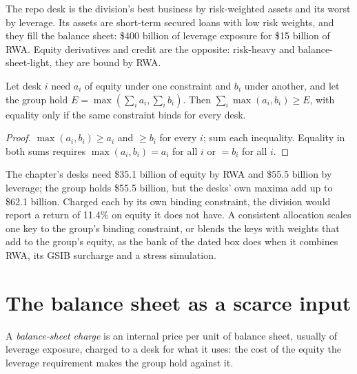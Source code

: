 The repo desk is the division's best business by risk-weighted assets and its worst by leverage. Its assets are short-term secured loans with low
risk weights, and they fill the balance sheet: \$400 billion of leverage exposure for \$15 billion of RWA. Equity derivatives and credit are the
opposite: risk-heavy and balance-sheet-light, they are bound by RWA.

\begin{proposition}\label{prop:fm:the-bank-markets-division:max}
Let desk $i$ need $a_i$ of equity under one constraint and $b_i$ under another, and let the group hold $E=\max(\sum_ia_i,\sum_ib_i)$. Then
$\sum_i\max(a_i,b_i)\ge E$, with equality only if the same constraint binds for every desk.
\end{proposition}

\begin{proof}
$\max(a_i,b_i)\ge a_i$ and $\ge b_i$ for every $i$; sum each inequality. Equality in both sums requires $\max(a_i,b_i)=a_i$ for all $i$ or
$=b_i$ for all $i$.
\end{proof}

The chapter's desks need \$35.1 billion of equity by RWA and \$55.5 billion by leverage; the group holds \$55.5 billion, but the desks' own
maxima add up to \$62.1 billion. Charged each by its own binding constraint, the division would report a return of 11.4\% on equity it does not
have. A consistent allocation scales one key to the group's binding constraint, or blends the keys with weights that add to the group's equity,
as the bank of the dated box does when it combines RWA, its GSIB surcharge and a stress simulation.

\section{The balance sheet as a scarce input}

\begin{definition}\label{def:fm:the-bank-markets-division:charge}
A \emph{balance-sheet charge} is an internal price per unit of balance sheet, usually of leverage exposure, charged
to a desk for what it uses: the cost of the equity the leverage requirement makes the group hold against it.
\end{definition}

